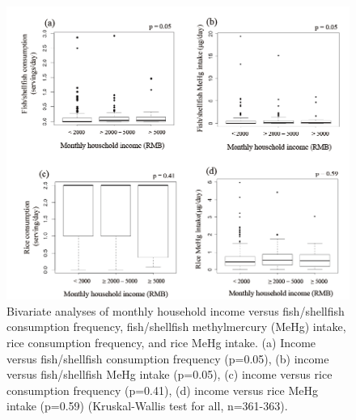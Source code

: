 \begin{figure}
  \centering
    \label{fig:Fig215}
  \includegraphics[scale=1]{Figures/Fig215.pdf}
  \caption[Bivariate analyses of monthly household income versus fish/shellfish consumption frequency, fish/shellfish methylmercury intake, rice consumption frequency, and rice methylmercury intake]{Bivariate analyses of monthly household income versus fish/shellfish consumption frequency, fish/shellfish methylmercury (MeHg) intake, rice consumption frequency, and rice MeHg intake. (a) Income versus fish/shellfish consumption frequency (p=0.05), (b) income versus fish/shellfish MeHg intake (p=0.05), (c) income versus rice consumption frequency (p=0.41), (d) income versus rice MeHg intake (p=0.59) (Kruskal-Wallis test for all, n=361-363).}
\end{figure}

